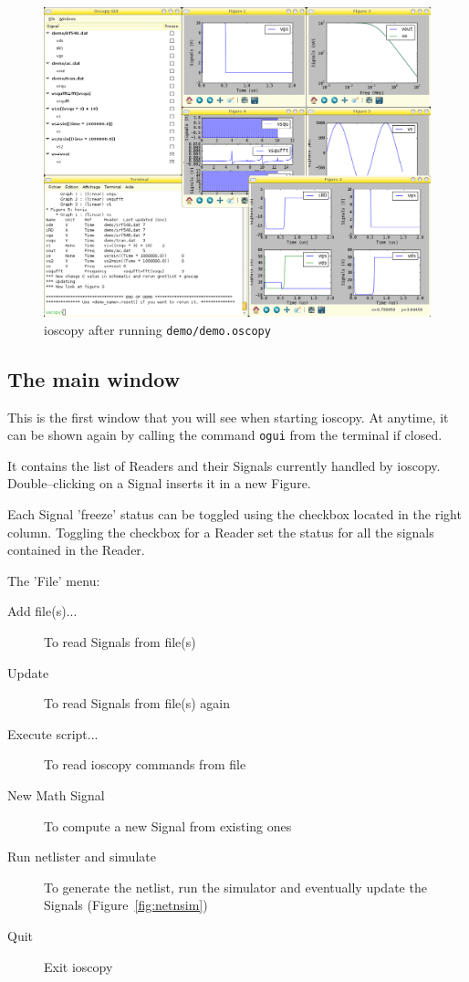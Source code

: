 \documentclass[a4paper,11pt]{article}
\begin{document}
\begin{figure}[htbp]
  \centering
  \includegraphics[width=.8\textwidth]{../png/ioscopy.png}
  \caption{ioscopy after running \texttt{demo/demo.oscopy}}
  \label{fig:screenshot}
\end{figure}

\subsection{The main window}
This is the first window that you will see when starting ioscopy.
At anytime, it can be shown again by calling the command \texttt{ogui} from the terminal if closed.

It contains the list of Readers and their Signals currently handled by ioscopy.
Double--clicking on a Signal inserts it in a new Figure.

Each Signal 'freeze' status can be toggled using the checkbox located in the right column.
Toggling the checkbox for a Reader set the status for all the signals contained in the Reader.

The 'File' menu:
\begin{description}
\item[Add file(s)...] To read Signals from file(s)
\item[Update] To read Signals from file(s) again
\item[Execute script...] To read ioscopy commands from file
\item[New Math Signal] To compute a new Signal from existing ones
\item[Run netlister and simulate] To generate the netlist, run the simulator and eventually update the Signals (Figure~\ref{fig:netnsim})
\item[Quit] Exit ioscopy
\end{description}
\end{document}
